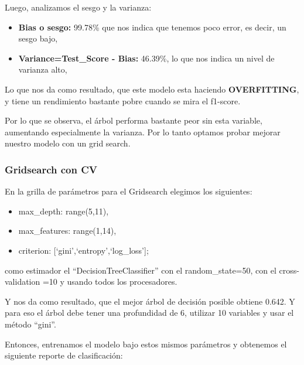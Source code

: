 \documentclass[a4paper]{article}
\begin{document}
            Luego, analizamos el sesgo y la varianza:
            \begin{itemize}
                \item \textbf{Bias o sesgo:} 99.78\% que nos indica que tenemos poco error, es decir, un sesgo bajo,
                \item \textbf{Variance=Test\_Score - Bias:} 46.39\%, lo que nos indica un nivel de varianza alto,
            \end{itemize}
            
            Lo que nos da como resultado, que este modelo esta haciendo \textbf{OVERFITTING}, y tiene un rendimiento bastante pobre cuando se mira el f1-score.

            Por lo que se observa, el árbol performa bastante peor sin esta variable, aumentando especialmente la varianza. Por lo tanto optamos probar mejorar nuestro modelo con un grid search.
        
        \subsubsection{Gridsearch con CV}
            
            En la grilla de parámetros para el Gridsearch elegimos los siguientes:
            \begin{itemize}
                \item max\_depth: range(5,11),
                \item max\_features: range(1,14),
                \item criterion: [`gini',`entropy',`log\_loss'];
            \end{itemize}
            como estimador el ``DecisionTreeClassifier'' con el random\_state=50, con el cross-validation =10 y usando todos los procesadores.

            Y nos da como resultado, que el mejor árbol de decisión posible obtiene 0.642. Y para eso el árbol debe tener una profundidad de  6, utilizar  10  variables y usar el método ``gini''.

            Entonces, entrenamos el modelo bajo estos mismos parámetros y obtenemos el siguiente reporte de clasificación:
\end{document}
